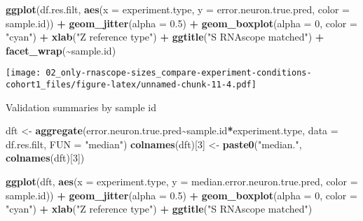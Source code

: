 \documentclass[
]{article}
\newenvironment{Shaded}{\begin{snugshade}}{\end{snugshade}}
\newcommand{\AttributeTok}[1]{\textcolor[rgb]{0.13,0.29,0.53}{#1}}
\newcommand{\DecValTok}[1]{\textcolor[rgb]{0.00,0.00,0.81}{#1}}
\newcommand{\FloatTok}[1]{\textcolor[rgb]{0.00,0.00,0.81}{#1}}
\newcommand{\FunctionTok}[1]{\textcolor[rgb]{0.13,0.29,0.53}{\textbf{#1}}}
\newcommand{\NormalTok}[1]{#1}
\newcommand{\OtherTok}[1]{\textcolor[rgb]{0.56,0.35,0.01}{#1}}
\newcommand{\SpecialCharTok}[1]{\textcolor[rgb]{0.81,0.36,0.00}{\textbf{#1}}}
\newcommand{\StringTok}[1]{\textcolor[rgb]{0.31,0.60,0.02}{#1}}
\begin{document}
\begin{Shaded}
\begin{Highlighting}[]
\FunctionTok{ggplot}\NormalTok{(df.res.filt, }\FunctionTok{aes}\NormalTok{(}\AttributeTok{x =}\NormalTok{ experiment.type, }
                        \AttributeTok{y =}\NormalTok{ error.neuron.true.pred, }\AttributeTok{color =}\NormalTok{ sample.id)) }\SpecialCharTok{+} \FunctionTok{geom\_jitter}\NormalTok{(}\AttributeTok{alpha =} \FloatTok{0.5}\NormalTok{) }\SpecialCharTok{+} 
  \FunctionTok{geom\_boxplot}\NormalTok{(}\AttributeTok{alpha =} \DecValTok{0}\NormalTok{, }\AttributeTok{color =} \StringTok{"cyan"}\NormalTok{) }\SpecialCharTok{+} \FunctionTok{xlab}\NormalTok{(}\StringTok{"Z reference type"}\NormalTok{) }\SpecialCharTok{+}
  \FunctionTok{ggtitle}\NormalTok{(}\StringTok{"S RNAscope matched"}\NormalTok{) }\SpecialCharTok{+} \FunctionTok{facet\_wrap}\NormalTok{(}\SpecialCharTok{\textasciitilde{}}\NormalTok{sample.id)}
\end{Highlighting}
\end{Shaded}

\texttt{[image: 02\_only-rnascope-sizes\_compare-experiment-conditions-cohort1\_files/figure-latex/unnamed-chunk-11-4.pdf]}

Validation summaries by sample id

\begin{Shaded}
\begin{Highlighting}[]
\NormalTok{dft }\OtherTok{\textless{}{-}} \FunctionTok{aggregate}\NormalTok{(error.neuron.true.pred}\SpecialCharTok{\textasciitilde{}}\NormalTok{sample.id}\SpecialCharTok{*}\NormalTok{experiment.type, }\AttributeTok{data =}\NormalTok{ df.res.filt, }\AttributeTok{FUN =} \StringTok{"median"}\NormalTok{)}
\FunctionTok{colnames}\NormalTok{(dft)[}\DecValTok{3}\NormalTok{] }\OtherTok{\textless{}{-}} \FunctionTok{paste0}\NormalTok{(}\StringTok{"median."}\NormalTok{, }\FunctionTok{colnames}\NormalTok{(dft)[}\DecValTok{3}\NormalTok{])}

\FunctionTok{ggplot}\NormalTok{(dft, }\FunctionTok{aes}\NormalTok{(}\AttributeTok{x =}\NormalTok{ experiment.type, }\AttributeTok{y =}\NormalTok{ median.error.neuron.true.pred, }\AttributeTok{color =}\NormalTok{ sample.id)) }\SpecialCharTok{+} \FunctionTok{geom\_jitter}\NormalTok{(}\AttributeTok{alpha =} \FloatTok{0.5}\NormalTok{) }\SpecialCharTok{+} 
  \FunctionTok{geom\_boxplot}\NormalTok{(}\AttributeTok{alpha =} \DecValTok{0}\NormalTok{, }\AttributeTok{color =} \StringTok{"cyan"}\NormalTok{) }\SpecialCharTok{+} \FunctionTok{xlab}\NormalTok{(}\StringTok{"Z reference type"}\NormalTok{) }\SpecialCharTok{+} \FunctionTok{ggtitle}\NormalTok{(}\StringTok{"S RNAscope matched"}\NormalTok{)}
\end{Highlighting}
\end{Shaded}
\end{document}
